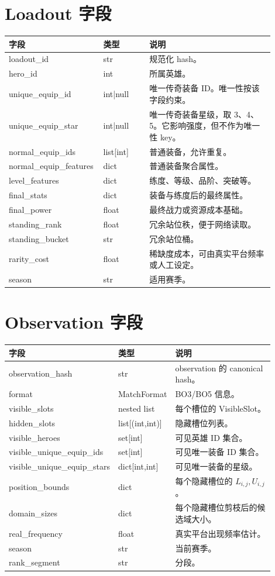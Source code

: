 \documentclass[UTF8,12pt,openany]{ctexbook}
\begin{document}
\section{Loadout 字段}
\begin{longtable}{p{0.27\linewidth}p{0.17\linewidth}p{0.46\linewidth}}
\toprule
字段 & 类型 & 说明 \\
\midrule
loadout\_id & str & 规范化 hash。\\
hero\_id & int & 所属英雄。\\
unique\_equip\_id & int|null & 唯一传奇装备 ID。唯一性按该字段约束。\\
unique\_equip\_star & int|null & 唯一传奇装备星级，取 3、4、5。它影响强度，但不作为唯一性 key。\\
normal\_equip\_ids & list[int] & 普通装备，允许重复。\\
normal\_equip\_features & dict & 普通装备聚合属性。\\
level\_features & dict & 练度、等级、品阶、突破等。\\
final\_stats & dict & 装备与练度后的最终属性。\\
final\_power & float & 最终战力或资源成本基础。\\
standing\_rank & float & 冗余站位秩，便于网络读取。\\
standing\_bucket & str & 冗余站位桶。\\
rarity\_cost & float & 稀缺度成本，可由真实平台频率或人工设定。\\
season & str & 适用赛季。\\
\bottomrule
\end{longtable}

\section{Observation 字段}
\begin{longtable}{p{0.27\linewidth}p{0.17\linewidth}p{0.46\linewidth}}
\toprule
字段 & 类型 & 说明 \\
\midrule
observation\_hash & str & observation 的 canonical hash。\\
format & MatchFormat & BO3/BO5 信息。\\
visible\_slots & nested list & 每个槽位的 VisibleSlot。\\
hidden\_slots & list[(int,int)] & 隐藏槽位列表。\\
visible\_heroes & set[int] & 可见英雄 ID 集合。\\
visible\_unique\_equip\_ids & set[int] & 可见唯一装备 ID 集合。\\
visible\_unique\_equip\_stars & dict[int,int] & 可见唯一装备的星级。\\
position\_bounds & dict & 每个隐藏槽位的 $L_{i,j},U_{i,j}$。\\
domain\_sizes & dict & 每个隐藏槽位剪枝后的候选域大小。\\
real\_frequency & float & 真实平台出现频率估计。\\
season & str & 当前赛季。\\
rank\_segment & str & 分段。\\
\bottomrule
\end{longtable}
\end{document}

